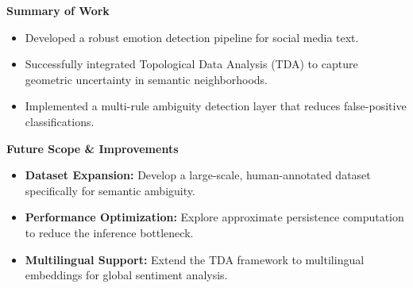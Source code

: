 \textbf{Summary of Work}
\begin{itemize}
    \item Developed a robust emotion detection pipeline for social media text.
    \item Successfully integrated Topological Data Analysis (TDA) to capture geometric uncertainty in semantic neighborhoods.
    \item Implemented a multi-rule ambiguity detection layer that reduces false-positive classifications.
\end{itemize}

\vspace{0.4cm}
\textbf{Future Scope \& Improvements}
\begin{itemize}
    \item \textbf{Dataset Expansion:} Develop a large-scale, human-annotated dataset specifically for semantic ambiguity.
    \item \textbf{Performance Optimization:} Explore approximate persistence computation to reduce the inference bottleneck.
    \item \textbf{Multilingual Support:} Extend the TDA framework to multilingual embeddings for global sentiment analysis.
\end{itemize}
